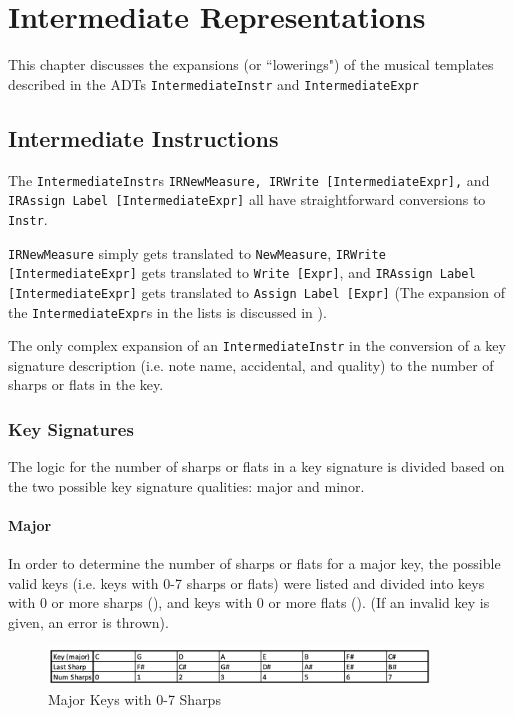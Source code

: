 \documentclass{report}
\begin{document}
\chapter{Intermediate Representations}
\label{chap:ir}
This chapter discusses the expansions (or ``lowerings") of the musical templates described in the ADTs \verb.IntermediateInstr. and \verb.IntermediateExpr. 

\section{Intermediate Instructions}
The \verb.IntermediateInstr.s \verb.IRNewMeasure, IRWrite [IntermediateExpr],. and \\\verb.IRAssign Label [IntermediateExpr]. all have straightforward conversions to \verb.Instr.. 

\verb.IRNewMeasure. simply gets translated to \verb.NewMeasure., \verb.IRWrite [IntermediateExpr]. gets translated to \verb.Write [Expr]., and \verb.IRAssign Label [IntermediateExpr]. gets translated to \verb.Assign Label [Expr]. (The expansion of the \verb.IntermediateExpr.s in the lists is discussed in ). 

The only complex expansion of an \verb.IntermediateInstr. in the conversion of a key signature description (i.e. note name, accidental, and quality) to the number of sharps or flats in the key.

\subsection{Key Signatures}
The logic for the number of sharps or flats in a key signature is divided based on the two possible key signature qualities: major and minor. 
\subsubsection{Major}

In order to determine the number of sharps or flats for a major key, the possible valid keys (i.e. keys with 0-7 sharps or flats) were listed and divided into keys with 0 or more sharps (), and keys with 0 or more flats (). (If an invalid key is given, an error is thrown).

\begin{figure}[h!]
\centering
\includegraphics[width=0.9\textwidth]{images/major_sharp}
\caption{Major Keys with 0-7 Sharps}
\label{major_sharp}
\end{figure}
\end{document}
